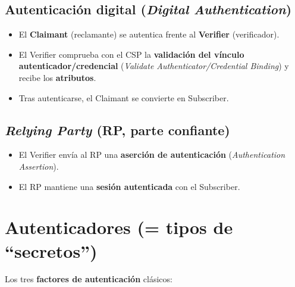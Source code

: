 \documentclass[11pt,a4paper]{report}
\begin{document}
\subsection*{Autenticación digital (\emph{Digital Authentication})}
\begin{itemize}
  \item El \textbf{Claimant} (reclamante) se autentica frente al \textbf{Verifier} (verificador).
  \item El Verifier comprueba con el CSP la \textbf{validación del vínculo autenticador/credencial} (\emph{Validate Authenticator/Credential Binding}) y recibe los \textbf{atributos}.
  \item Tras autenticarse, el Claimant se convierte en Subscriber.
\end{itemize}
 
\subsection*{\emph{Relying Party} (RP, parte confiante)}
\begin{itemize}
  \item El Verifier envía al RP una \textbf{aserción de autenticación} (\emph{Authentication Assertion}).
  \item El RP mantiene una \textbf{sesión autenticada} con el Subscriber.
\end{itemize}
 
\section{Autenticadores (= tipos de ``secretos'')}
 
Los tres \textbf{factores de autenticación} clásicos:
 
\end{document}
